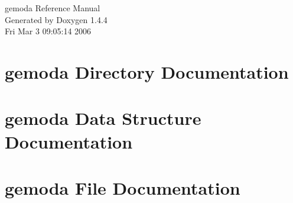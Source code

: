 \documentclass[letterpaper]{book}
\begin{document}
\begin{titlepage}
\vspace*{7cm}
\begin{center}
{\Large gemoda Reference Manual}\\
\vspace*{1cm}
{\large Generated by Doxygen 1.4.4}\\
\vspace*{0.5cm}
{\small Fri Mar 3 09:05:14 2006}\\
\end{center}
\end{titlepage}
\clearemptydoublepage
{}
\tableofcontents
\clearemptydoublepage
{}
\chapter{gemoda Directory Documentation}

\chapter{gemoda Data Structure Documentation}












\chapter{gemoda File Documentation}






















\printindex
\end{document}
